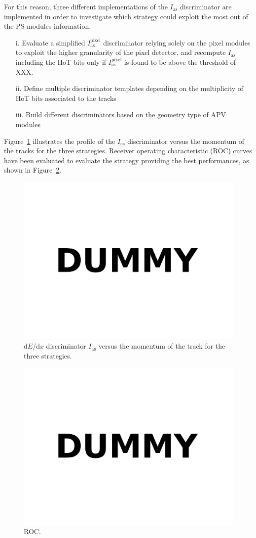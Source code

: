 \documentclass[11pt,oneside,a4paper]{article}
\begin{document}
For this reason, three different implementations of the $I_{\mathrm{as}}$ discriminator are implemented in order to investigate which strategy could exploit the most out of the PS modules information.

\begin{itemize}
 \item[i.]   Evaluate a simplified $I_{\mathrm{as}}^{\mathrm{pixel}}$ discriminator relying solely on the pixel modules to exploit the higher granularity of the pixel detector, and recompute $I_{\mathrm{as}}$ including the HoT bits only if $I_{\mathrm{as}}^{\mathrm{pixel}}$ is found to be above the threshold of XXX.
 \item[ii.]  Define multiple discriminator templates depending on the multiplicity of HoT bits associated to the tracks
 \item[iii.] Build different discriminators based on the  geometry type of APV modules 
\end{itemize}

Figure~\ref{fig:dedxvsp} illustrates the profile of the $I_{\mathrm{as}}$ discriminator versus the momentum of the tracks for the three strategies.
Receiver operating characteristic (ROC) curves have been evaluated to evaluate the strategy providing the best performances, as shown in Figure~\ref{fig:roc}.

\begin{figure}
\centering
\includegraphics[width=.5\textwidth]{figures/dummy.pdf}
\caption{$\mathrm{d}E/\mathrm{d}x$ discriminator $I_{\mathrm{as}}$ versus the momentum of the track for the three strategies.\label{fig:dedxvsp}}
\end{figure}

\begin{figure}
\centering
\includegraphics[width=.5\textwidth]{figures/dummy.pdf}
\caption{ROC.\label{fig:roc}}
\end{figure}
\end{document}
